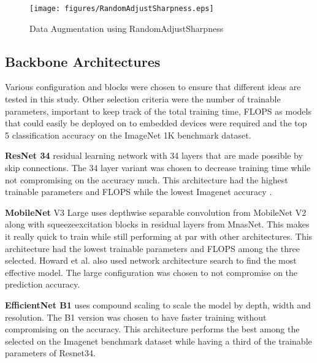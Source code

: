\documentclass[conference]{IEEEtran}
\begin{document}
\begin{figure}[htbp] 
    \texttt{[image: figures/RandomAdjustSharpness.eps]} 
    \caption{Data Augmentation using RandomAdjustSharpness} 
    \label{fig} 
    \end{figure}
    
\subsection{Backbone Architectures}
Various configuration and blocks were chosen to ensure that different ideas are tested in this study. Other selection criteria were the number of trainable parameters, important to keep track of the total training time, FLOPS as models that could easily be deployed on to embedded
devices were required and the top 5 classification accuracy on the ImageNet 1K benchmark dataset.

\textbf{ResNet 34} residual learning network with 34 layers that are made possible by skip connections. The 34 layer variant was chosen to decrease training time while not compromising on the accuracy much. This
architecture had the highest trainable parameters and FLOPS while the lowest Imagenet accuracy \cite{b18}.

\textbf{MobileNet} V3 Large uses depthwise separable convolution from MobileNet V2 along with squeezeexcitation blocks in residual layers from MnasNet. This makes it really quick to train while still performing at
par with other architectures. This architecture had the lowest trainable parameters and FLOPS among the three selected. Howard et al. \cite{b19} also used network architecture search to find the most effective model. The large configuration was chosen to not compromise on the prediction accuracy.

\textbf{EfficientNet B1} uses compound scaling to scale the model by depth, width and resolution. The B1 version was chosen to have faster training without compromising on the accuracy. \cite{b20} This architecture performs the best among the selected on the Imagenet benchmark dataset while having a third of the trainable parameters of Resnet34.
\end{document}

